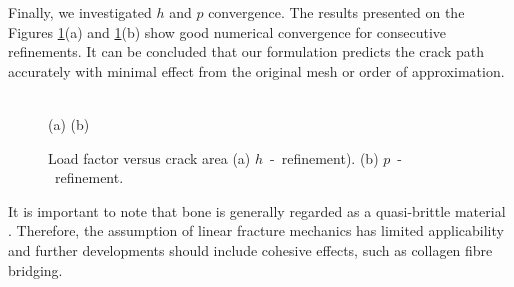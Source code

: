 \documentclass[onecolumn]{svjour3}
\begin{document}
% 
% 
Finally, we investigated $h$ and $p$ convergence. The results presented on the Figures \ref{fig:load_factor2}(a) and \ref{fig:load_factor2}(b) show good numerical convergence for consecutive refinements. It can be concluded that our formulation predicts the crack path accurately with minimal effect from the original mesh or order of approximation. 
% 
\begin{figure}[h]
	\centering
	\begin{minipage}{.45\textwidth}
	\end{minipage}%
	\begin{minipage}{.45\textwidth}
	\end{minipage} \\
	(a)\hspace{5cm} (b)
			 \caption{Load factor versus crack area (a) $h$~-~refinement). (b) $p$~-~refinement.}
		 \label{fig:load_factor2}
	\end{figure}
% 
% 
It is important to note that bone is generally regarded as a quasi-brittle material \cite{gasser2007numerical}. Therefore, the assumption of linear fracture mechanics has limited applicability and further developments should include cohesive effects, such as collagen fibre bridging. 
\end{document}
